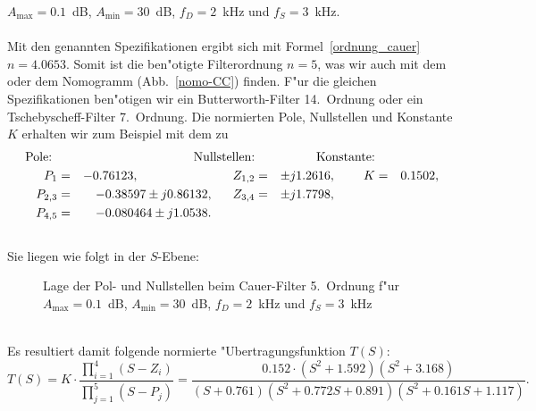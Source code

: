 \clearpage
{}
$A_{\max}=0.1$~dB, $A_{\min}=30$~dB, $f_{D}=2$~kHz und $f_{S}=3$~kHz.\\~\\
\nit Mit den genannten Spezifikationen ergibt sich mit Formel~\ref{ordnung_cauer} $n=4.0653$. Somit ist die ben"otigte
Filterordnung
$n=5$, was wir auch mit dem  oder dem Nomogramm
(Abb.~\ref{nomo-CC}) finden. F"ur die gleichen Spezifikationen
ben"otigen wir ein Butterworth-Filter 14.~Ordnung oder ein
Tschebyscheff-Filter 7.~Ordnung.  Die normierten Pole, Nullstellen und Konstante
$K$ erhalten wir zum Beispiel mit dem  zu\\
\begin{equation*}
\begin{aligned}
\text{Pole: }\\
P_{1}  &=&- 0.76123,\hspace*{2.1cm}\\    
P_{2,3}&=&- 0.38597 \pm j 0.86132, \\
P_{4,5}&=&- 0.080464 \pm j 1.0538. 
\end{aligned}\hspace*{-5mm}
\begin{aligned}
\text{Nullstellen:}\\
Z_{1,2}&=& \pm j 1.2616,\\
Z_{3,4}&=& \pm j 1.7798,\\
{}
\end{aligned}\hspace*{-5mm}
\begin{aligned}
\text{Konstante:}\\
K&=& 0.1502,\\
{}\\
{}
\end{aligned}
\end{equation*}\\
Sie liegen wie folgt in der $S$-Ebene:
\begin{figure}[!htb]
\vspace*{-4mm}
\begin{center}
  \vspace*{-5mm}\caption{Lage der Pol- und Nullstellen beim Cauer-Filter 5.~Ordnung f"ur $A_{\max}=0.1$~dB, $A_{\min}=30$~dB, $f_{D}=2$~kHz und $f_{S}=3$~kHz}
\end{center}
\vspace*{-6mm}
\end{figure}\\
Es resultiert damit folgende normierte "Ubertragungsfunktion $T(S)$:
\begin{equation*}
T(S)=K \cdot\frac{{\displaystyle \prod_{i=1}^{4}} (S-Z_{i})}
{{\displaystyle \prod_{j=1}^{5}} (S-P_{j})}=\frac{0.152\cdot (S^{2}+1.592)(S^{2}+3.168)}{(S+0.761)(S^{2}+0.772 S+0.891)(S^{2}+0.161S+1.117)}.
\end{equation*}

